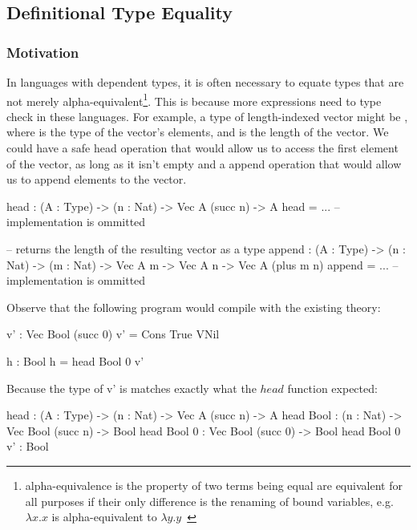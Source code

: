 \documentclass[
       embeddedlogo,
       english,
       lmodern,
       coorientadorbanca,
       noabntexcite
]{ufsc-thesis-rn46-2019}
\theoremstyle{definition}
\newcommand{\code}[1]{\text{\scpfamily\setlength\spaceskip{0.35em}#1}}
\begin{document}
\subsection{Definitional Type Equality}

\subsubsection{Motivation}

In languages with dependent types, it is often necessary to equate types that are not merely alpha-equivalent\footnote{alpha-equivalence is the property of two terms being equal are equivalent for all purposes if their only difference is the renaming of bound variables, e.g. $\lambda x.x$ is alpha-equivalent to $\lambda y.y$~\cite{nlab:alpha-equivalence}}. This is because more expressions need to type check in these languages.
For example, a type of length-indexed vector might be \code{Vec A n}, where \code{A} is the type of the vector's elements, and \code{n} is the length of the vector.
We could have a safe head operation that would allow us to access the first element of the vector, as long as it isn't empty and a append operation that would allow us to append elements to the vector.

\begin{piforall}
       head : (A : Type) -> (n : Nat) -> Vec A (succ n) -> A
       head = ... -- implementation is ommitted

       -- returns the length of the resulting vector as a type
       append : (A : Type) -> (n : Nat) -> (m : Nat) -> Vec A m -> Vec A n -> Vec A (plus m n)
       append = ... -- implementation is ommitted
\end{piforall}

Observe that the following program would compile with the existing theory:

\begin{piforall}
       v' : Vec Bool (succ 0)
       v' = Cons True VNil

       h : Bool
       h = head Bool 0 v'
\end{piforall}


Because the type of v' is \code{Vec Bool (succ 0)} matches exactly what the $head$ function expected:

\begin{piforall}
       head : (A : Type) -> (n : Nat) -> Vec A (succ n) -> A
       head Bool : (n : Nat) -> Vec Bool (succ n) -> Bool
       head Bool 0 : Vec Bool (succ 0) -> Bool
       head Bool 0 v' : Bool
\end{piforall}
\end{document}
